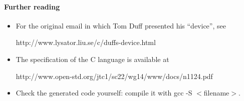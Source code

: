 \documentclass{article}
\begin{document}
\paragraph{Further reading}
\begin{itemize}
\item For the original email in which Tom Duff presented his ``device'',
see 

\textsf{http://www.lysator.liu.se/c/duffs-device.html}
\item The specification of the C language is available at 

\textsf{http://www.open-std.org/jtc1/sc22/wg14/www/docs/n1124.pdf}
\item Check the generated code yourself: compile it
with \textsf{gcc -S $<$filename$>$}.
\end{itemize}

\vfill
\end{document}
